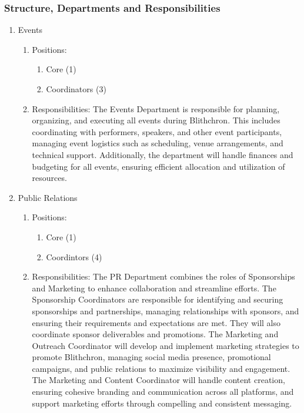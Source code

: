 \documentclass[12pt]{article}
\begin{document}
\subsubsection{Structure, Departments and Responsibilities}
\begin{enumerate}
    \item Events
    \begin{enumerate}
        \item Positions:
        \begin{enumerate}
            \item Core (1)
            \item Coordinators (3)
        \end{enumerate}
        \item Responsibilities: The Events Department is responsible for planning, organizing, and executing all events during Blithchron. This includes coordinating with performers, speakers, and other event participants, managing event logistics such as scheduling, venue arrangements, and technical support. Additionally, the department will handle finances and budgeting for all events, ensuring efficient allocation and utilization of resources.
    \end{enumerate}
    \item Public Relations
    \begin{enumerate}
        \item Positions:
        \begin{enumerate}
            \item Core (1)
            \item Coordintors (4)
        \end{enumerate}
        \item Responsibilities: The PR Department combines the roles of Sponsorships and Marketing to enhance collaboration and streamline efforts. The Sponsorship Coordinators are responsible for identifying and securing sponsorships and partnerships, managing relationships with sponsors, and ensuring their requirements and expectations are met. They will also coordinate sponsor deliverables and promotions. The Marketing and Outreach Coordinator will develop and implement marketing strategies to promote Blithchron, managing social media presence, promotional campaigns, and public relations to maximize visibility and engagement. The Marketing and Content Coordinator will handle content creation, ensuring cohesive branding and communication across all platforms, and support marketing efforts through compelling and consistent messaging.

\end{enumerate}
\end{enumerate}
\end{document}
